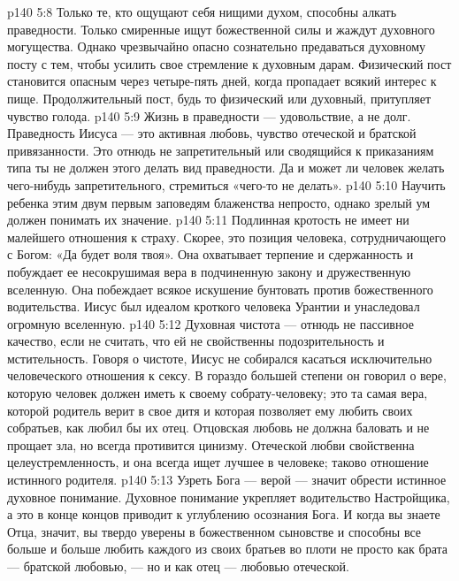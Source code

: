 \vs p140 5:8 \bibnobreakspace {} Только те, кто ощущают себя нищими духом, способны алкать праведности. Только смиренные ищут божественной силы и жаждут духовного могущества. Однако чрезвычайно опасно сознательно предаваться духовному посту с тем, чтобы усилить свое стремление к духовным дарам. Физический пост становится опасным через четыре\hyp{}пять дней, когда пропадает всякий интерес к пище. Продолжительный пост, будь то физический или духовный, притупляет чувство голода.
\vs p140 5:9 Жизнь в праведности --- удовольствие, а не долг. Праведность Иисуса --- это активная любовь, чувство отеческой и братской привязанности. Это отнюдь не запретительный или сводящийся к приказаниям типа ты не должен этого делать вид праведности. Да и может ли человек желать чего\hyp{}нибудь запретительного, стремиться «чего\hyp{}то не делать».
\vs p140 5:10 \pc Научить ребенка этим двум первым заповедям блаженства непросто, однако зрелый ум должен понимать их значение.
\vs p140 5:11 \bibnobreakspace {} Подлинная кротость не имеет ни малейшего отношения к страху. Скорее, это позиция человека, сотрудничающего с Богом: «Да будет воля твоя». Она охватывает терпение и сдержанность и побуждает ее несокрушимая вера в подчиненную закону и дружественную вселенную. Она побеждает всякое искушение бунтовать против божественного водительства. Иисус был идеалом кроткого человека Урантии и унаследовал огромную вселенную.
\vs p140 5:12 \bibnobreakspace {} Духовная чистота --- отнюдь не пассивное качество, если не считать, что ей не свойственны подозрительность и мстительность. Говоря о чистоте, Иисус не собирался касаться исключительно человеческого отношения к сексу. В гораздо большей степени он говорил о вере, которую человек должен иметь к своему собрату\hyp{}человеку; это та самая вера, которой родитель верит в свое дитя и которая позволяет ему любить своих собратьев, как любил бы их отец. Отцовская любовь не должна баловать и не прощает зла, но всегда противится цинизму. Отеческой любви свойственна целеустремленность, и она всегда ищет лучшее в человеке; таково отношение истинного родителя.
\vs p140 5:13 Узреть Бога --- верой --- значит обрести истинное духовное понимание. Духовное понимание укрепляет водительство Настройщика, а это в конце концов приводит к углублению осознания Бога. И когда вы знаете Отца, значит, вы твердо уверены в божественном сыновстве и способны все больше и больше любить каждого из своих братьев во плоти не просто как брата --- братской любовью, --- но и как отец --- любовью отеческой.
